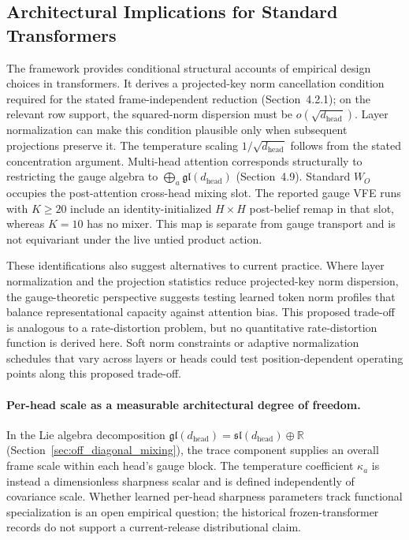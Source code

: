 \documentclass[twoside,11pt]{article}
\begin{document}
\subsection{Architectural Implications for Standard Transformers}

The framework provides conditional structural accounts of empirical design choices in transformers. It derives a projected-key norm cancellation condition required for the stated frame-independent reduction (Section~4.2.1); on the relevant row support, the squared-norm dispersion must be $o(\sqrt{d_{\mathrm{head}}})$. Layer normalization can make this condition plausible only when subsequent projections preserve it. The temperature scaling $1/\sqrt{d_{\mathrm{head}}}$ follows from the stated concentration argument. Multi-head attention corresponds structurally to restricting the gauge algebra to $\bigoplus_a \mathfrak{gl}(d_{\mathrm{head}})$ (Section~4.9). Standard $W_O$ occupies the post-attention cross-head mixing slot. The reported gauge VFE runs with $K\geq20$ include an identity-initialized $H\times H$ post-belief remap in that slot, whereas $K=10$ has no mixer. This map is separate from gauge transport and is not equivariant under the live untied product action.

These identifications also suggest alternatives to current practice. Where layer normalization and the projection statistics reduce projected-key norm dispersion, the gauge-theoretic perspective suggests testing learned token norm profiles that balance representational capacity against attention bias. This proposed trade-off is analogous to a rate-distortion problem, but no quantitative rate-distortion function is derived here. Soft norm constraints or adaptive normalization schedules that vary across layers or heads could test position-dependent operating points along this proposed trade-off.

\paragraph{Per-head scale as a measurable architectural degree of freedom.}
In the Lie algebra decomposition $\mathfrak{gl}(d_{\text{head}})=\mathfrak{sl}(d_{\text{head}})\oplus\mathbb{R}$ (Section~\ref{sec:off_diagonal_mixing}), the trace component supplies an overall frame scale within each head's gauge block. The temperature coefficient $\kappa_a$ is instead a dimensionless sharpness scalar and is defined independently of covariance scale. Whether learned per-head sharpness parameters track functional specialization is an open empirical question; the historical frozen-transformer records do not support a current-release distributional claim.
\end{document}
